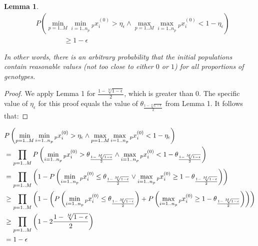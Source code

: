 \documentclass{sig-alt-full}
\newtheorem{lemma}{Lemma}
\newcommand\prodc[1]{\prod_{#1}}
\begin{document}
\begin{multicols}{2}
\begin{lemma}
\[
\begin{split}
&P\left( \min_{p=1..M} \min_{i=1..n_p} {_p}x^{(0)}_i > \eta_\epsilon \wedge \max_{p=1..M} \max_{i=1..n_p} {_p}x^{(0)}_i < 1-\eta_\epsilon\right)\\
&\qquad\qquad\geq 1 - \epsilon
\end{split}
\]
\renewcommand{\qed}{ }

In other words, there is an arbitrary probability that the initial populations contain reasonable values (not too close to either $0$ or $1$) for all proportions of genotypes.
\end{lemma}


\begin{proof}
We apply Lemma 1 for $\frac{1-\sqrt[M]{1-\epsilon}}{2}$, which is greater than 0.  The specific value of $\eta_\epsilon$ for this proof equals the value of $\theta_\frac{1-\sqrt[M]{1-\epsilon}}{2}$ from Lemma 1.  It follows that:
\renewcommand{\qed}{ }
\end{proof}

\end{multicols}

\begin{eqnarray*}
& P\left( \min_{p=1..M} \min_{i=1..n_p} {_p}x^{(0)}_i > \eta_\epsilon \wedge \max_{p=1..M} \max_{i=1..n_p} {_p}x^{(0)}_i < 1-\eta_\epsilon \right)\\
& = \prodc{p=1..M} P \left( \min_{i=1..n_p} {_p}x^{(0)}_i > \theta_\frac{1-\sqrt[M]{1-\epsilon}}{2} \wedge \max_{i=1..n_p} {_p}x^{(0)}_i < 1-\theta_\frac{1-\sqrt[M]{1-\epsilon}}{2} \right) \\
&  =  \prodc{p=1..M} \left( 1 - P \left( \min_{i=1..n_p} {_p}x^{(0)}_i \leq \theta_\frac{1-\sqrt[M]{1-\epsilon}}{2} \vee \max_{i=1..n_p} {_p}x^{(0)}_i \geq 1-\theta_\frac{1-\sqrt[M]{1-\epsilon}}{2} \right) \right)\\
& \geq \prodc{p=1..M} \left( 1 - \left( P \left( \min_{i=1..n_p} {_p}x^{(0)}_i \leq \theta_\frac{1-\sqrt[M]{1-\epsilon}}{2} \right) + P \left( \max_{i=1..n_p} {_p}x^{(0)}_i \geq 1-\theta_\frac{1-\sqrt[M]{1-\epsilon}}{2} \right) \right) \right)\\
& \geq \prodc{p=1..M} \left( 1 - 2 \frac{1-\sqrt[M]{1-\epsilon}}{2} \right) \\
& = 1 - \epsilon \qquad \qquad \qed
\end{eqnarray*}
\end{document}

